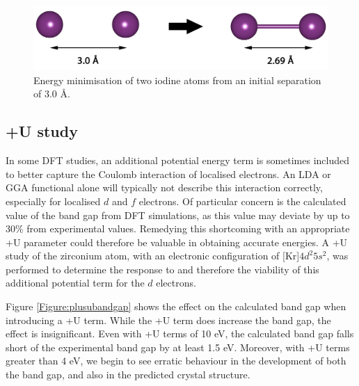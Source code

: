 \begin{figure}[ht] %
\centering
\includegraphics[width=14cm]{images/iodine_molecule.png}
\caption{Energy minimisation of two iodine atoms from an initial separation of 3.0 \r{A}.}
\label{figure:iodine_dimer}
\end{figure}

\subsection{+U study}
\label{subsection:plus_U}

In some DFT studies, an additional potential energy term is sometimes included to better capture the Coulomb interaction of localised electrons. An LDA or GGA functional alone will typically not describe this interaction correctly, especially for localised $d$ and $f$ electrons. Of particular concern is the calculated value of the band gap from DFT simulations, as this value may deviate by up to 30\% from experimental values. Remedying this shortcoming with an appropriate +U parameter could therefore be valuable in obtaining accurate energies. A +U study of the zirconium atom, with an electronic configuration of [Kr]$4d^{2}5s^{2}$, was performed to determine the response to and therefore the viability of this additional potential term for the $d$ electrons.

Figure \ref{Figure:plusubandgap} shows the effect on the calculated band gap when introducing a +U term. While the +U term does increase the band gap, the effect is insignificant. Even with +U terms of 10 eV, the calculated band gap falls short of the experimental band gap by at least 1.5 eV. Moreover, with +U terms greater than 4 eV, we begin to see erratic behaviour in the development of both the band gap, and also in the predicted crystal structure.




